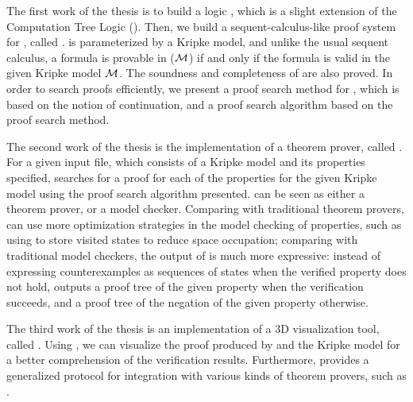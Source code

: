 The first work of the thesis is to build a logic \CTLP{}, which is a slight extension of the Computation Tree Logic (\CTL{}). Then, we build a sequent-calculus-like proof system for \CTLP{}, called \SCTL{}. \SCTL{} is parameterized by a Kripke model, and unlike the usual sequent calculus, a \CTLP{} formula is provable in \SCTL($\cal M$) if and only if the formula is valid in the given Kripke model $\cal M$. The soundness and completeness of \SCTL{} are also proved. In order to search proofs efficiently, we present a proof search method for \SCTL{}, which is based on the notion of continuation, and a proof search algorithm based on the proof search method.


The second work of the thesis is the implementation of a theorem prover, called \sctlprov{}. For a given input file, which consists of a Kripke model and its properties specified, \sctlprov{} searches for a proof for each of the properties for the given Kripke model using the proof search algorithm presented. 
\sctlprov{} can be seen as either a theorem prover, or a model checker. 
Comparing with traditional theorem provers, \sctlprov{} can use more optimization strategies in the model checking of \CTL{} properties, such as using \BDD{} to store visited states to reduce space occupation; comparing with traditional model checkers, the output of \sctlprov{} is much more expressive: 
instead of expressing counterexamples as sequences of states when the verified property does not hold, \sctlprov{} outputs a proof tree of the given property when the verification succeeds, and a proof tree of the negation of the given property otherwise.

The third work of the thesis is an implementation of a 3D visualization tool, called . Using , we can visualize the proof produced by \sctlprov{} and the Kripke model for a better comprehension of the verification results. Furthermore,  provides a generalized protocol for integration with various kinds of theorem provers, such as .


